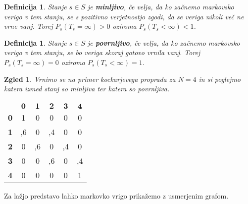 \documentclass[a4paper,12pt]{article}
\newtheorem{definicija}[izrek]{Definicija}
\newtheorem{zgled}[izrek]{Zgled}
\begin{document}
\begin{definicija}
    Stanje $s \in S$ je \textbf{minljivo}, če velja, da ko začnemo markovsko verigo v tem stanju, se s pozitivno verjetnostjo zgodi, da se veriga nikoli več ne vrne vanj. 
    Torej $P_s(T_s = \infty) > 0$ oziroma $P_s(T_s < \infty) < 1$.
\end{definicija}

\begin{definicija}
    Stanje $s \in S$  je \textbf{povrnljivo}, če velja, da ko začnemo markovsko verigo v tem stanju, se bo veriga skoraj gotovo vrnila vanj. \newline
     Torej $P_s(T_s = \infty) = 0$ oziroma $P_s(T_s < \infty) = 1$.
\end{definicija}


\begin{zgled}
    Vrnimo se na primer kockarjevega proprada za $N=4$ in si poglejmo katera izmed stanj so minljiva ter katera so povrnljiva.
\end{zgled}

    \begin{center}
        \begin{tabular}{ >{\bfseries}c c c c c c }
          & $\mathbf{0}$ & $\mathbf{1}$ & $\mathbf{2}$ & $\mathbf{3}$ & $\mathbf{4}$\\ 
         0 & 1 & 0 & 0 & 0 & 0 \\  
         1 & ,6 & 0 & ,4 & 0 & 0 \\
         2 & 0 & ,6 & 0 & ,4 & 0 \\
         3 & 0 & 0 & ,6 & 0 & ,4 \\
         4 & 0 & 0 & 0 & 0 & 1                    
        \end{tabular}
    \end{center}

Za lažjo predstavo lahko markovko vrigo prikažemo z usmerjenim grafom.

    \begin{center}
    \end{center}
\end{document}

